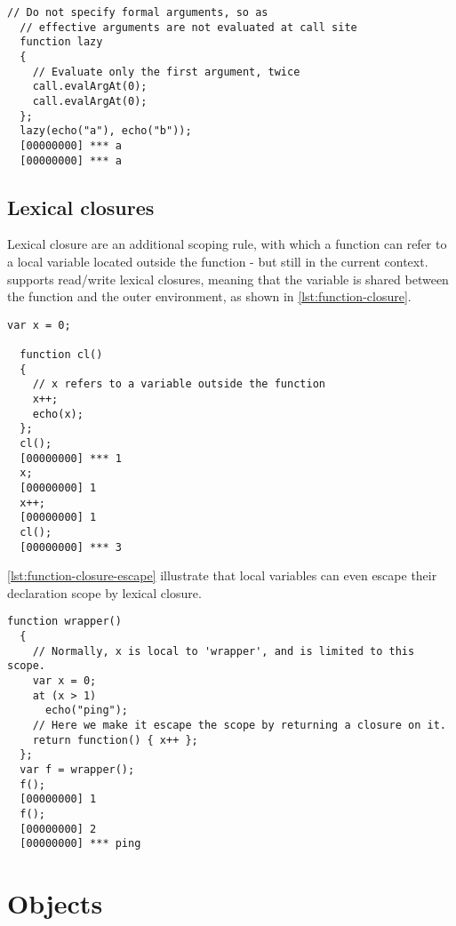 \documentclass[openright,twoside,12pt]{report}
\begin{document}
\begin{lstlisting}[caption=Lazy
  function,label=lst:function-lazy,float=\floatposh]
  // Do not specify formal arguments, so as
  // effective arguments are not evaluated at call site
  function lazy
  {
    // Evaluate only the first argument, twice
    call.evalArgAt(0);
    call.evalArgAt(0);
  };
  lazy(echo("a"), echo("b"));
  [00000000] *** a
  [00000000] *** a
\end{lstlisting}

\subsection{Lexical closures}
\label{sec:us-fun-closures}

Lexical closure are an additional scoping rule, with which a function
can refer to a local variable located outside the function - but still
in the current context. \us supports read/write lexical closures,
meaning that the variable is shared between the function and the outer
environment, as shown in \autoref{lst:function-closure}.

\begin{lstlisting}[caption=Lexical
  closure,label=lst:function-closure,float=\floatpos]
  var x = 0;

  function cl()
  {
    // x refers to a variable outside the function
    x++;
    echo(x);
  };
  cl();
  [00000000] *** 1
  x;
  [00000000] 1
  x++;
  [00000000] 1
  cl();
  [00000000] *** 3
\end{lstlisting}

\autoref{lst:function-closure-escape} illustrate that local variables can even
escape their declaration scope by lexical closure.

\begin{lstlisting}[caption=Local variable escaping its scope by
  lexical closure.,label=lst:function-closure-escape,float=\floatpos]
  function wrapper()
  {
    // Normally, x is local to 'wrapper', and is limited to this scope.
    var x = 0;
    at (x > 1)
      echo("ping");
    // Here we make it escape the scope by returning a closure on it.
    return function() { x++ };
  };
  var f = wrapper();
  f();
  [00000000] 1
  f();
  [00000000] 2
  [00000000] *** ping
\end{lstlisting}

\FloatBarrier
\section{Objects}
\end{document}
